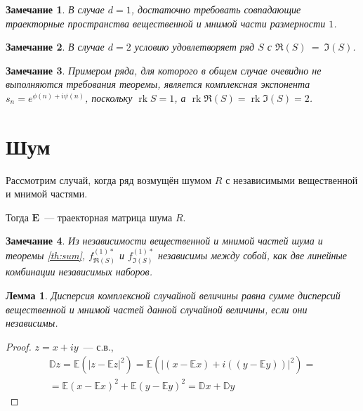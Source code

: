 \documentclass[specialist,
               substylefile = spbu.rtx,
               subf,href,colorlinks=true, 12pt]{disser}
\newtheorem*{notice*}{Замечание}
\newtheorem{lemma}{Лемма}
\DeclareMathOperator{\rk}{rk}
\begin{document}
\begin{notice*}
	В случае $d = 1$, достаточно требовать совпадающие траекторные пространства вещественной и мнимой части размерности $1$. 
\end{notice*}

\begin{notice*}
	В случае $d = 2$ условию удовлетворяет ряд $S$ с $\Re(S)~=~\Im(S)$. 
\end{notice*}


\begin{notice*}
	Примером ряда, для которого в общем случае очевидно не выполняются требования теоремы, является комплексная экспонента $s_n = e^{\phi(n) + i\psi(n)}$, поскольку $\rk S = 1$, а $\rk\Re(S) = \rk\Im(S) = 2$.
\end{notice*}


\section{Шум}

Рассмотрим случай, когда ряд возмущён шумом $R$ с независимыми вещественной и мнимой частями.

Тогда $\mathbf{E}$~--- траекторная матрица шума $R$.


\begin{notice*}
	Из независимости вещественной и мнимой частей шума и теоремы \ref{th:sum}, $f^{(1)*}_{\Re(S)}$ и $f^{(1)*}_{\Im(S)}$ независимы между собой, как две линейные комбинации независимых наборов.
\end{notice*}

\begin{lemma} \label{std:disp}
	Дисперсия комплексной случайной величины равна сумме дисперсий вещественной и мнимой частей данной случайной величины, если они независимы.
\end{lemma}
\begin{proof}
	$z = x + iy$~--- с.в., 
	\begin{multline*}
		\mathbb{D}z = \mathbb{E}(|z - \mathbb{E}z|^2) = \mathbb{E}(|(x - \mathbb{E}x) + i((y - \mathbb{E}y))|^2) = \\
		= \mathbb{E}(x - \mathbb{E}x)^2 + \mathbb{E}(y - \mathbb{E}y)^2 = \mathbb{D}x + \mathbb{D}y
	\end{multline*}
\end{proof}
\end{document}
